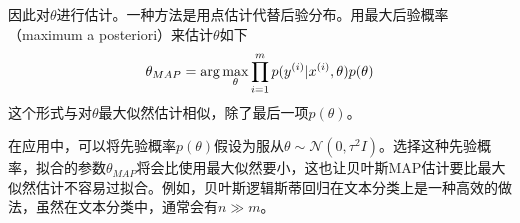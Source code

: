 因此对$\theta$进行估计。一种方法是用点估计代替后验分布。用最大后验概率（maximum a posteriori）来估计$\theta$如下
\begin{eqnarray}
\theta_{MAP}=\arg\max_\theta\prod_{i=1}^mp({y}^{({i})}|{x}^{({i})},\theta)p(\theta)
\end{eqnarray}
这个形式与对$\theta$最大似然估计相似，除了最后一项$p(\theta)$。

在应用中，可以将先验概率$p(\theta)$假设为服从$\theta\sim\mathcal{N}(0,\tau^2I)$。选择这种先验概率，拟合的参数$\theta_{MAP}$将会比使用最大似然要小，这也让贝叶斯MAP估计要比最大似然估计不容易过拟合。例如，贝叶斯逻辑斯蒂回归在文本分类上是一种高效的做法，虽然在文本分类中，通常会有$n\gg m$。








